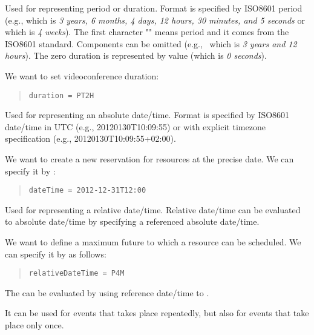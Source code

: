 \begin{Api}

Used for representing period or duration. Format is specified by ISO8601 period (e.g.,  which is \textit{3 years, 6 months, 4 days, 12 hours, 30 minutes, and 5 seconds} or  which is \textit{4 weeks}). The first character "" means period and it comes from the ISO8601 standard. Components can be omitted (e.g.,~ which is \emph{3 years and 12 hours}). The zero duration is represented by  value (which is \emph{0 seconds}).

\ApiExample We want to set videoconference duration:
\begin{quote}
\begin{verbatim}
duration = PT2H
\end{verbatim}
\end{quote}

Used for representing an absolute date/time. Format is specified by ISO8601 date/time in UTC (e.g., 20120130T10:09:55) or with explicit timezone specification (e.g., 20120130T10:09:55+02:00).

\ApiExample We want to create a new reservation for resources at the precise date. We can specify it by :
\begin{quote}
\begin{verbatim}
dateTime = 2012-12-31T12:00
\end{verbatim}
\end{quote}

Used for representing a relative date/time. Relative date/time can be evaluated to absolute date/time by specifying a referenced absolute date/time.

\ApiExample We want to define a maximum future to which a resource can be scheduled. We can specify it by  as follows:
\begin{quote}
\begin{verbatim}
relativeDateTime = P4M
\end{verbatim}
\end{quote}
The  can be evaluated by using reference date/time  to .

It can be used for events that takes place repeatedly, but also for events that take place only once.


\end{Api}

